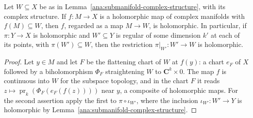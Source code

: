 \begin{lemma}
\label{ana:submanifold-corestriction}
\leanok
Let \(W\subseteq X\) be as in Lemma~\ref{ana:submanifold-complex-structure}, with its complex
structure. If \(f:M\to X\) is a holomorphic map of complex manifolds with \(f(M)\subseteq W\), then
\(f\), regarded as a map \(M\to W\), is holomorphic. In particular, if \(\pi:Y\to X\) is holomorphic
and \(W'\subseteq Y\) is regular of some dimension \(k'\) at each of its points, with
\(\pi(W')\subseteq W\), then the restriction \(\pi|_{W'}:W'\to W\) is holomorphic.
\end{lemma}
\begin{proof}
\leanok
Let \(y\in M\) and let \(F\) be the flattening chart of \(W\) at \(f(y)\): a chart \(e_F\) of \(X\)
followed by a biholomorphism \(\Phi_F\) straightening \(W\) to \(\mathbf C^k\times0\). The map
\(f\) is continuous into \(W\) for the subspace topology, and in the chart \(F\) it reads
\(z\mapsto\operatorname{pr}_k(\Phi_F(e_F(f(z))))\) near \(y\), a composite of holomorphic maps. For the
second assertion apply the first to \(\pi\circ\iota_{W'}\), where the inclusion
\(\iota_{W'}:W'\to Y\) is holomorphic by Lemma~\ref{ana:submanifold-complex-structure}.
\end{proof}
